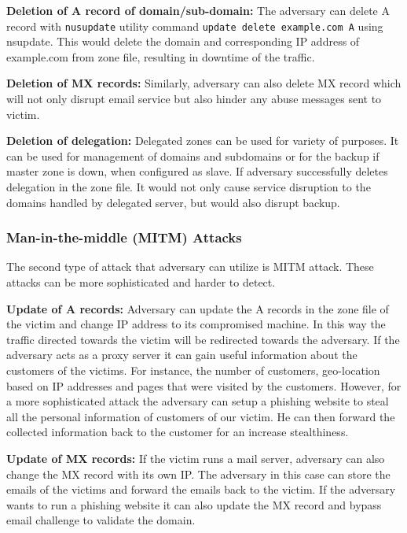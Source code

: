 \textbf{Deletion of A record of domain/sub-domain:} The adversary can delete A record with \texttt{nusupdate} utility command \texttt{update delete example.com A} using nsupdate. This would delete the domain and corresponding IP address of example.com from zone file, resulting in downtime of the traffic. 

\textbf{Deletion of MX records:} Similarly, adversary can also delete MX record which will not only disrupt email service but also hinder any abuse messages sent to victim.  



 \textbf{Deletion of delegation:} Delegated zones can be used for variety of purposes. It can be used for management of domains and subdomains or for the backup if master zone is down,  when configured as slave. If adversary successfully deletes delegation in the zone file. It would not only cause service disruption to the  domains handled by delegated server, but would also disrupt backup. 


\subsubsection{Man-in-the-middle (MITM) Attacks}
The second type of attack that adversary can utilize is MITM attack. These attacks can be more sophisticated and harder to detect. 

\textbf{Update of A records:}
Adversary can update the A records in the zone file of the victim and change IP address to its compromised machine. In this way the traffic directed towards the victim will be redirected towards the adversary. If the adversary acts as a proxy server it can gain useful information about the customers of the victims. For instance, the number of customers, geo-location based on IP addresses and pages that were visited by the customers. However, for a more sophisticated attack the adversary can setup a phishing website to steal all the personal information of customers of our victim. He can then forward the collected information back to the customer for an increase stealthiness. 

\textbf{Update of MX records:} 
If the victim runs a mail server, adversary can also change the MX record with its own IP. The adversary in this case can store the emails of the victims and forward the emails back to the victim. If the adversary wants to run a phishing website it can also update the MX record and bypass email challenge to validate the domain. 

